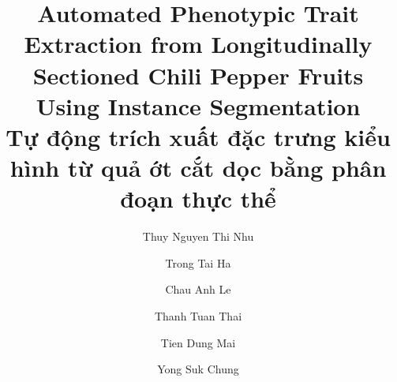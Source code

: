 \documentclass[final,1p,11pt,longtitle]{elsarticle}
\begin{document}
\begin{frontmatter}

\title{Automated Phenotypic Trait Extraction from Longitudinally Sectioned Chili Pepper Fruits Using Instance Segmentation\\[0.6em]{\large\color{viColor} Tự động trích xuất đặc trưng kiểu hình từ quả ớt cắt dọc bằng phân đoạn thực thể}}

\author[1,2]{Thuy Nguyen Thi Nhu}

\author[1,2]{Trong Tai Ha}

\author[1,2]{Chau Anh Le}

\author[1,2,3]{Thanh Tuan Thai}

\author[1,2]{Tien Dung Mai}

\author[3]{Yong Suk Chung}

\address[1]{Faculty of Computer Science, University of Information Technology, Ho Chi Minh city 70000, Vietnam\\{\color{viColor} Khoa Khoa học Máy tính, Trường Đại học Công nghệ Thông tin, Thành phố Hồ Chí Minh 70000, Việt Nam}}
\address[2]{Vietnam National University, Ho Chi Minh city 70000, Vietnam\\{\color{viColor} Đại học Quốc gia Thành phố Hồ Chí Minh, Thành phố Hồ Chí Minh 70000, Việt Nam}}
\address[3]{Department of Plant Resources and Environment, Jeju National University, Jeju 63243, Republic of Korea\\{\color{viColor} Khoa Tài nguyên Thực vật và Môi trường, Đại học Quốc gia Jeju, Jeju 63243, Hàn Quốc}}


\end{frontmatter}
\end{document}
